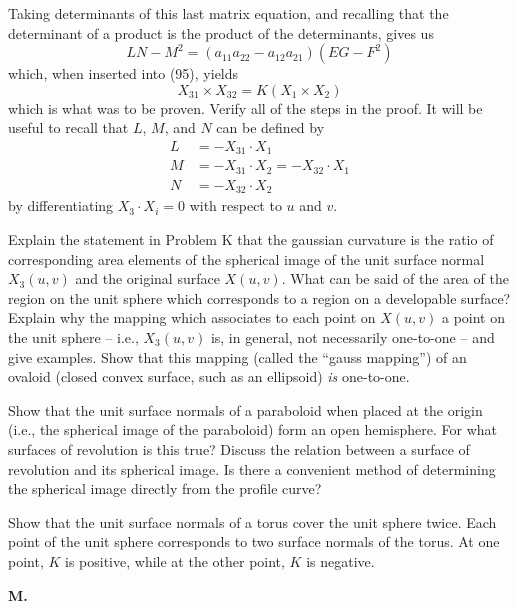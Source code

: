 \documentclass{book}
\begin{document}
Taking determinants of this last matrix equation, and recalling that the determinant of a product is the product of the determinants, gives us
\begin{equation*}
LN - M^{2} = (a_{11} a_{22} - a_{12} a_{21}) (EG - F^{2})
\end{equation*}
which, when inserted into (95), yields
\begin{equation*}
X_{31} \times X_{32} = K(X_{1} \times X_{2})
\end{equation*}
which is what was to be proven. Verify all of the steps in the proof. It will be useful to recall that $L$, $M$, and $N$ can be defined by
\begin{align*}
L & = - X_{31} \cdot X_{1} \\
M & = - X_{31} \cdot X_{2} = - X_{32} \cdot X_{1} \\
N & = - X_{32} \cdot X_{2}
\end{align*}
by differentiating $X_{3} \cdot X_{i} = 0$ with respect to $u$ and $v$.

Explain the statement in Problem K that the gaussian curvature is the ratio of corresponding area elements of the spherical image of the unit surface normal $X_{3}(u,v)$ and the original surface $X(u,v)$. What can be said of the area of the region on the unit sphere which corresponds to a region on a developable surface? Explain why the mapping which associates to each point on $X(u,v)$ a point on the unit sphere -- i.e., $X_{3}(u,v)$ is, in general, not necessarily one-to-one -- and give examples. Show that this mapping (called the ``gauss mapping'') of an ovaloid (closed convex surface, such as an ellipsoid) \emph{is} one-to-one.

Show that the unit surface normals of a paraboloid when placed at the origin (i.e., the spherical image of the paraboloid) form an open hemisphere. For what surfaces of revolution is this true? Discuss the relation between a surface of revolution and its spherical image. Is there a convenient method of determining the spherical image directly from the profile curve?

Show that the unit surface normals of a torus cover the unit sphere twice. Each point of the unit sphere corresponds to two surface normals of the torus. At one point, $K$ is positive, while at the other point, $K$ is negative.

\vspace{0.3cm}

\noindent \textbf{M.}

\vspace{0.3cm}
\end{document}
